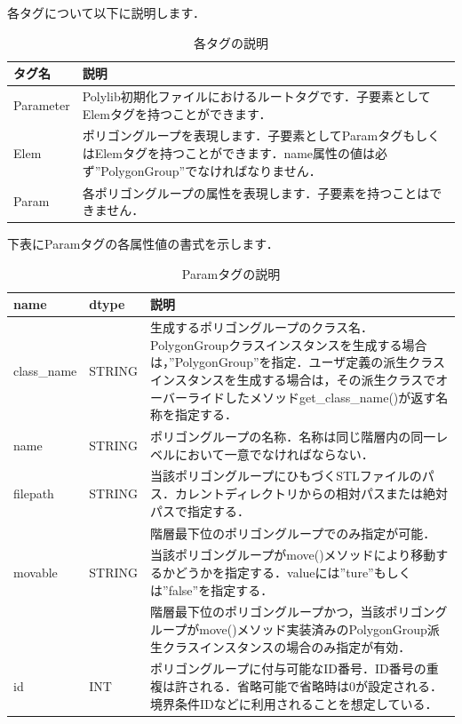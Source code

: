 {各タグについて以下に説明します．

\begin{table}[htbp]
 \begin{tabular}{|l|p{34em}|} \hline
 タグ名 & 説明 \\\hline
 Parameter & Polylib初期化ファイルにおけるルートタグです．子要素としてElemタグを持つことができます． \\\hline
 Elem & ポリゴングループを表現します．子要素としてParamタグもしくはElemタグを持つことができます．name属性の値は必ず''PolygonGroup''でなければなりません． \\\hline
 Param & 各ポリゴングループの属性を表現します．子要素を持つことはできません． \\\hline
 \end{tabular}
 \caption{各タグの説明}
 \label{tbl:elem param}
\end{table}

\pagebreak

下表にParamタグの各属性値の書式を示します．

\begin{table}[htbp]
 \begin{tabular}{|l|l|p{34em}|} \hline
 name & dtype & 説明 \\\hline
 \hline
 class\_name & STRING & 生成するポリゴングループのクラス名．PolygonGroupクラスインスタンスを生成する場合は，''PolygonGroup''を指定．ユーザ定義の派生クラスインスタンスを生成する場合は，その派生クラスでオーバーライドしたメソッドget\_class\_name()が返す名称を指定する． \\\hline
 name & STRING & ポリゴングループの名称．名称は同じ階層内の同一レベルにおいて一意でなければならない． \\\hline
 \multicolumn{1}{|l|}{filepath} & \multicolumn{1}{l|}{STRING} & 当該ポリゴングループにひもづくSTLファイルのパス．カレントディレクトリからの相対パスまたは絶対パスで指定する． \\
 \multicolumn{1}{|l|}{} & \multicolumn{1}{l|}{} & 階層最下位のポリゴングループでのみ指定が可能． \\\hline
 \multicolumn{1}{|l|}{movable} & \multicolumn{1}{l|}{STRING} & 当該ポリゴングループがmove()メソッドにより移動するかどうかを指定する．valueには''ture''もしくは''false''を指定する． \\
 \multicolumn{1}{|l|}{} & \multicolumn{1}{l|}{} & 階層最下位のポリゴングループかつ，当該ポリゴングループがmove()メソッド実装済みのPolygonGroup派生クラスインスタンスの場合のみ指定が有効． \\\hline
 id & INT & ポリゴングループに付与可能なID番号．ID番号の重複は許される．省略可能で省略時は0が設定される．境界条件IDなどに利用されることを想定している． \\\hline
 \end{tabular}
 \caption{Paramタグの説明}
 \label{tbl:param tag}
\end{table}

}
